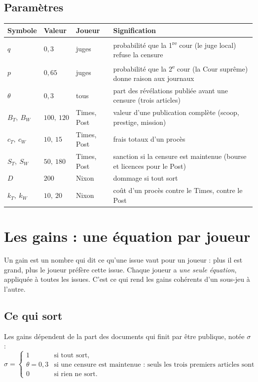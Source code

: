 \documentclass[11pt,a4paper]{article}
\theoremstyle{definition}
\begin{document}
\subsection{Paramètres}
\begin{center}
\small
\begin{tabular}{@{}lllp{8.2cm}@{}}
\toprule
Symbole & Valeur & Joueur & Signification \\
\midrule
$q$ & $0,3$ & juges & probabilité que la 1\textsuperscript{re} cour (le juge local) refuse la censure \\
$p$ & $0,65$ & juges & probabilité que la 2\textsuperscript{e} cour (la Cour suprême) donne raison aux journaux \\
$\theta$ & $0,3$ & tous & part des révélations publiée avant une censure (trois articles) \\
$B_T,\ B_W$ & $100,\ 120$ & Times, Post & valeur d'une publication complète (scoop, prestige, mission) \\
$c_T,\ c_W$ & $10,\ 15$ & Times, Post & frais totaux d'un procès \\
$S_T,\ S_W$ & $50,\ 180$ & Times, Post & sanction si la censure est maintenue (bourse et licences pour le Post) \\
$D$ & $200$ & Nixon & dommage si tout sort \\
$k_T,\ k_W$ & $10,\ 20$ & Nixon & coût d'un procès contre le Times, contre le Post \\
\bottomrule
\end{tabular}
\end{center}

\section{Les gains : une équation par joueur}

Un gain est un nombre qui dit ce qu'une issue vaut pour un joueur : plus il est grand, plus le joueur préfère cette issue. Chaque joueur a \emph{une seule équation}, appliquée à toutes les issues. C'est ce qui rend les gains cohérents d'un sous-jeu à l'autre.

\subsection{Ce qui sort}
Les gains dépendent de la part des documents qui finit par être publique, notée $\sigma$ :
\[
\sigma=\begin{cases}1 & \text{si tout sort,}\\ \theta=0,3 & \text{si une censure est maintenue : seuls les trois premiers articles sont parus,}\\ 0 & \text{si rien ne sort.}\end{cases}
\]
\end{document}
